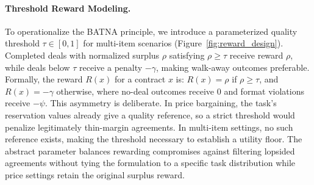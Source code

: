 \documentclass[11pt]{article}
\begin{document}
\paragraph{Threshold Reward Modeling.} To operationalize the BATNA principle, we introduce a parameterized quality threshold $\tau \in [0, 1]$ for multi-item scenarios (Figure~\ref{fig:reward_design}). Completed deals with normalized surplus $\rho$ satisfying $\rho \geq \tau$ receive reward $\rho$, while deals below $\tau$ receive a penalty $-\gamma$, making walk-away outcomes preferable. Formally, the reward $R(x)$ for a contract $x$ is: $R(x) = 
\rho$ if $\rho \geq \tau$, and $R(x) = 
-\gamma$ otherwise, where no-deal outcomes receive $0$ and format violations receive $-\psi$. This asymmetry is deliberate. In price bargaining, the task's reservation values already give a quality reference, so a strict threshold would penalize legitimately thin-margin agreements. In multi-item settings, no such reference exists, making the threshold necessary to establish a utility floor. The abstract parameter balances rewarding compromises against filtering lopsided agreements without tying the formulation to a specific task distribution while price settings retain the original surplus reward.
\end{document}
